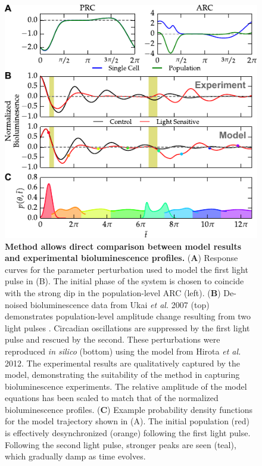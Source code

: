 \documentclass[11pt, letterpaper]{article}
\providecommand{\DIFadd}[1]{{\protect\color{blue}#1}} %
\providecommand{\DIFaddFL}[1]{\DIFadd{#1}} %
\providecommand{\DIFaddbeginFL}{} %
\providecommand{\DIFaddendFL}{} %
\begin{document}
\begin{figure}[tbp]
  \begin{center}
    \DIFaddbeginFL \includegraphics[width=.75\textwidth]{figures/figure_5.pdf}
    \DIFaddendFL \caption{
{\bfseries \DIFaddbeginFL \DIFaddFL{Method allows direct comparison between model results and }\DIFaddendFL experimental \DIFaddbeginFL \DIFaddFL{bioluminescence profiles}\DIFaddendFL .} 
({\bfseries A}) \DIFaddbeginFL \DIFaddFL{Response curves for the parameter perturbation used to model the first light pulse in (B).
The initial phase of the system is chosen to coincide with the strong dip in the population-level ARC (left).
(}{\bfseries \DIFaddFL{B}}\DIFaddFL{) }\DIFaddendFL De-noised bioluminescence data from Ukai {\itshape et al.} 2007 (top) demonstrates population-level amplitude change resulting from two light pulses \cite{Ukai2007}.
\DIFaddbeginFL \DIFaddFL{Circadian oscillations are suppressed by the }\DIFaddendFL first \DIFaddbeginFL \DIFaddFL{light }\DIFaddendFL pulse \DIFaddbeginFL \DIFaddFL{and rescued by }\DIFaddendFL the second.
These perturbations were reproduced {\itshape in silico} (bottom) using the model from Hirota {\itshape et al.} 2012.
The experimental results are qualitatively captured by the model, demonstrating the suitability of the \DIFaddbeginFL \DIFaddFL{method }\DIFaddendFL in capturing bioluminescence experiments.
\DIFaddbeginFL \DIFaddFL{The relative amplitude of the model equations has been scaled to match that of the normalized bioluminescence profiles.
}\DIFaddendFL ({\bfseries \DIFaddbeginFL \DIFaddFL{C}\DIFaddendFL }) Example probability density functions for the model trajectory shown in \DIFaddbeginFL \DIFaddFL{(}\DIFaddendFL A\DIFaddbeginFL \DIFaddFL{)}\DIFaddendFL .
 The initial population (red) is effectively desynchronized \DIFaddbeginFL \DIFaddFL{(orange) }\DIFaddendFL following the first light pulse.
Following the second light pulse, stronger peaks are seen (teal), which gradually damp as time evolves.} \end{center}
\end{figure}
\end{document}
